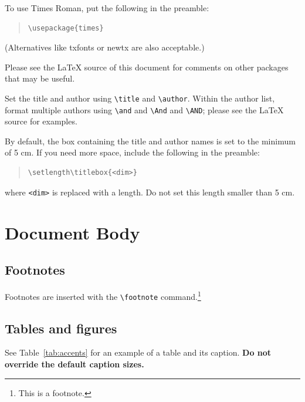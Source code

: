 To use Times Roman, put the following in the preamble:
\begin{quote}
\begin{verbatim}
\usepackage{times}
\end{verbatim}
\end{quote}
(Alternatives like txfonts or newtx are also acceptable.)

Please see the \LaTeX{} source of this document for comments on other packages that may be useful.

Set the title and author using \verb|\title| and \verb|\author|. Within the author list, format multiple authors using \verb|\and| and \verb|\And| and \verb|\AND|; please see the \LaTeX{} source for examples.

By default, the box containing the title and author names is set to the minimum of 5 cm. If you need more space, include the following in the preamble:
\begin{quote}
\begin{verbatim}
\setlength\titlebox{<dim>}
\end{verbatim}
\end{quote}
where \verb|<dim>| is replaced with a length. Do not set this length smaller than 5 cm.

\section{Document Body}

\subsection{Footnotes}

Footnotes are inserted with the \verb|\footnote| command.\footnote{This is a footnote.}

\subsection{Tables and figures}

See Table~\ref{tab:accents} for an example of a table and its caption.
\textbf{Do not override the default caption sizes.}

